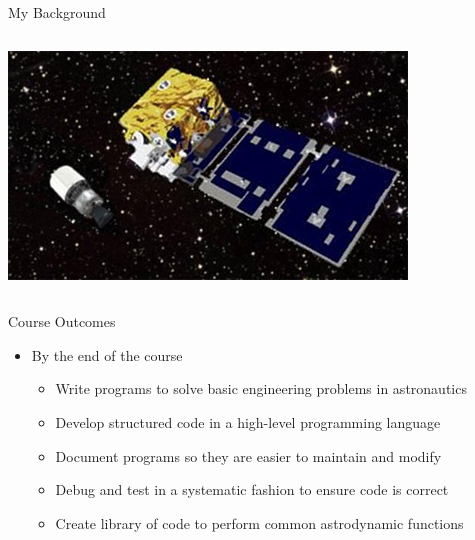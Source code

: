 \documentclass[11pt,professionalfonts]{beamer}
\begin{document}
\begin{frame}{My Background}
\begin{columns}
\begin{column}{0.5\textwidth}
            \includegraphics[width=\textwidth, height=0.3\textheight, keepaspectratio]{figures/angels__2.jpg}
        \end{column}
    \end{columns}
\end{frame}

\begin{frame}{Course Outcomes}
    \begin{itemize}
        \item By the end of the course
            \begin{itemize}
                \item Write programs to solve basic engineering problems in astronautics
                \item Develop structured code in a high-level programming language
                \item Document programs so they are easier to maintain and modify
                \item Debug and test in a systematic fashion to ensure code is correct
                \item Create library of code to perform common astrodynamic functions
            \end{itemize}
    \end{itemize}
\end{frame}
\end{document}
